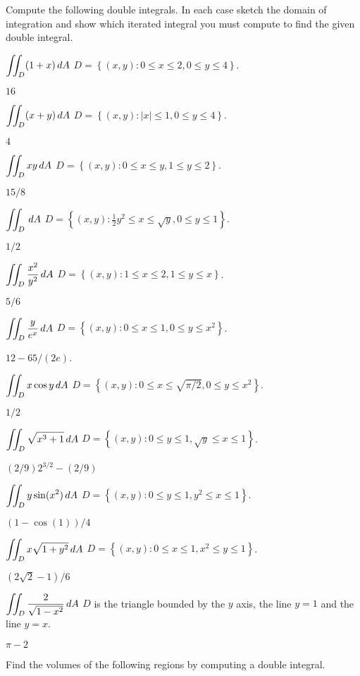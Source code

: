 \problem Compute the following double integrals.  
In each case sketch the domain of integration and
show which iterated integral you must compute to find the given double
integral.

\noindent\parbox{0.8\textwidth}{%
\subprob $\displaystyle \iint_D (1+x) \,dA $
\hfill$D = \left\{ (x,y) : 0\leq x\leq 2, 0\leq y\leq 4 \right\}$.
}
\answer
$16$
\endanswer

\noindent\parbox{0.8\textwidth}{%
\subprob $\displaystyle \iint_D (x+y)\,dA $ 
\hfill$D = \left\{ (x,y) : |x|\leq1, 0\leq y\leq 4 \right\}$.
}
\answer
$4$
\endanswer


\noindent\parbox{0.8\textwidth}{%
\subprob $\displaystyle \iint_D xy \,dA $ 
\hfill$D = \left\{ (x,y) : 0\le x\le y, 1\le y \le 2 \right\}$.
}
\answer
$15/8$
\endanswer


\noindent\parbox{0.8\textwidth}{%
\subprob $\displaystyle \iint_{D} \,dA $ 
\hfill$D = \left\{ (x,y) : \tfrac12y^2\le x\le \sqrt{y}, 0\le y\le 1 \right\}$.
}
\answer
$1/2$
\endanswer


\noindent\parbox{0.8\textwidth}{%
\subprob $\displaystyle \iint_{D} {x^2\over y^2}\,dA $ 
\hfill$D = \left\{ (x,y) : 1\le x\le2, 1\le y\le x \right\}$.
}
\answer
$5/6$
\endanswer


\noindent\parbox{0.8\textwidth}{%
\subprob $\displaystyle \iint_D {y\over e^x}\,dA $ 
\hfill$D = \left\{ (x,y) : 0\le x\le1, 0\le y\le x^2 \right\}$.
}
\answer
$12-65/(2e)$.
\endanswer


\noindent\parbox{0.8\textwidth}{%
\subprob $\displaystyle \iint_D x\cos y\,dA $ 
\hfill$D = \left\{ (x,y) : 0\le x\le \sqrt{\pi/2}, 0\le y\le x^2 \right\}$.
}
\answer
$1/2$
\endanswer


\noindent\parbox{0.8\textwidth}{%
\subprob  $\displaystyle \iint_D  
\sqrt{x^3+1}\,dA $
\hfill$D = \left\{ (x,y) : 0\le y\le 1, \surd y\le x\le 1 \right\}$.
}
\answer
$(2/9)2^{3/2}-(2/9)$
\endanswer

\noindent\parbox{0.8\textwidth}{%
\subprob $\displaystyle \iint_D   y\sin(x^2)\,dA $
\hfill$D = \left\{ (x,y) : 0\le y\le 1, y^2\le x\le 1 \right\}$.
}
\answer
$(1-\cos(1))/4$
\endanswer

\noindent\parbox{0.8\textwidth}{%
\subprob $\displaystyle \iint_D x\sqrt{1+y^2}\,dA $ 
\hfill$D = \left\{ (x,y) : 0\le x\le1, x^2\le y\le1 \right\}$.
}
\answer
$(2\sqrt2-1)/6$
\endanswer

\noindent\parbox{0.8\textwidth}{%
\subprob $\displaystyle \iint_D {2\over\sqrt{1-x^2}}\,dA $ 
\hfill$D$ is the triangle bounded by the $y$ axis, the line $y=1$ and
the line $y=x$.
}
\answer
$\pi-2$
\endanswer

\problem Find the volumes of the following regions by computing a double integral.

